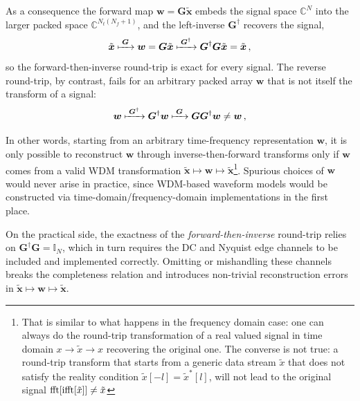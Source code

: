 \documentclass[twocolumn,preprintnumbers,
  superscriptaddress,
  nofootinbib,
  amsmath,
  amssymb,
  aps,
  prd,
  colorlinks=true,
  linkcolor=blue,
  urlcolor=blue,
  citecolor=blue,
  anchorcolor=blue
]{revtex4-2}
\begin{document}
As a consequence the forward map $\boldsymbol{w} = \boldsymbol{G}\tilde{\boldsymbol{x}}$ embeds the signal space $\mathbb{C}^N$ into the larger packed space $\mathbb{C}^{N_t(N_f+1)}$, and the left-inverse $\boldsymbol{G}^\dagger$ recovers the signal,
\begin{equation}
    \tilde{\boldsymbol{x}} \xmapsto{\;\boldsymbol{G}\;} \boldsymbol{w} = \boldsymbol{G}\tilde{\boldsymbol{x}} \xmapsto{\;\boldsymbol{G}^\dagger\;} \boldsymbol{G}^\dagger\boldsymbol{G}\tilde{\boldsymbol{x}} = \tilde{\boldsymbol{x}} \,,
\end{equation}
so the forward-then-inverse round-trip is exact for every signal. The reverse round-trip, by contrast, fails for an arbitrary packed array $\boldsymbol{w}$ that is not itself the transform of a signal:
\begin{equation}
    \boldsymbol{w} \xmapsto{\;\boldsymbol{G}^\dagger\;} \boldsymbol{G}^\dagger\boldsymbol{w} \xmapsto{\;\boldsymbol{G}\;} \boldsymbol{G}\boldsymbol{G}^\dagger\boldsymbol{w} \neq \boldsymbol{w} \,,
\end{equation}

In other words, starting from an arbitrary time-frequency representation $\boldsymbol{w}$, it is only possible to reconstruct $\boldsymbol{w}$ through inverse-then-forward transforms only if $\boldsymbol{w}$ comes from a valid WDM transformation $\tilde{\boldsymbol{x}}\mapsto\boldsymbol{w}\mapsto\tilde{\boldsymbol{x}}$\footnote{That is similar to what happens in the frequency domain case: one can always do the round-trip transformation of a real valued signal in time domain $x\to \tilde x\to x$ recovering the original one. The converse is not true: a round-trip transform that starts from a generic data stream $\tilde x$ that does not satisfy the reality condition $\tilde x[-l]=\tilde x^*[l]$, will not lead to the original signal ${\rm fft}[{\rm ifft}[\tilde x]]\neq \tilde x$}. Spurious choices of $\boldsymbol{w}$ would never arise in practice, since WDM-based waveform models would be constructed via time-domain/frequency-domain implementations in the first place. 

On the practical side, the exactness of the \emph{forward-then-inverse} round-trip relies on $\boldsymbol{G}^\dagger\boldsymbol{G} = \mathbb{I}_N$, which in turn requires the DC and Nyquist edge channels to be included and implemented correctly. Omitting or mishandling these channels breaks the completeness relation and introduces non-trivial reconstruction errors in $\tilde{\boldsymbol{x}} \mapsto \boldsymbol{w} \mapsto \tilde{\boldsymbol{x}}$. 
\end{document}
